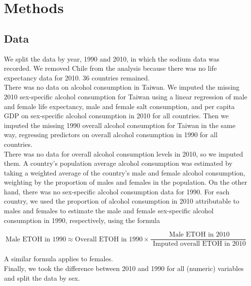 \documentclass{article}
\begin{document}
\let\thefootnote\relax{}

\section{Methods}

\subsection{Data}
We split the data by year, 1990 and 2010, in which the sodium data was recorded.  We removed Chile from the analysis because there was no life expectancy data for 2010. 36 countries remained.  \\

There was no data on alcohol consumption in Taiwan.  We imputed the missing 2010 sex-specific alcohol consumption for Taiwan using a linear regression of male and female life expectancy, male and female salt consumption, and per capita GDP on sex-specific alcohol consumption in 2010 for all countries. Then we imputed the missing 1990 overall alcohol consumption for Taiwan in the same way, regressing predictors on overall alcohol consumption in 1990 for all countries. \\
 
There was no data for overall alcohol consumption levels in 2010, so we imputed them. A country's population average alcohol consumption was estimated by taking a weighted average of the country's male and female alcohol consumption, weighting by the proportion of males and females in the population.  On the other hand, there was no sex-specific alcohol consumption data for 1990.  For each country, we used the proportion of alcohol consumption in 2010 attributable to males and females to estimate the male and female sex-specific alcohol consumption in 1990, respectively, using the formula

$$\text{Male ETOH in 1990} \approx \text{Overall ETOH in 1990} \times \frac{\text{ Male ETOH in 2010}}{\text{ Imputed overall ETOH in 2010}}$$

\noindent A similar formula applies to females. \\

Finally, we took the difference between 2010 and 1990 for all (numeric) variables and split the data by sex.
\end{document}

